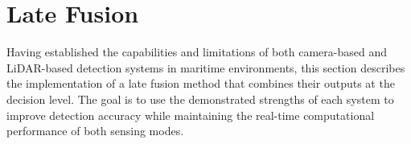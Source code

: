 \documentclass{erauthesis}
\begin{document}

\section{Late Fusion} \label{fusion}
\label{fusion_method}
Having established the capabilities and limitations of both camera-based and LiDAR-based detection systems in maritime environments, this section describes the implementation of a late fusion method that combines their outputs at the decision level. 
The goal is to use the demonstrated strengths of each system to improve detection accuracy while maintaining the real-time computational performance of both sensing modes. 
\end{document}
